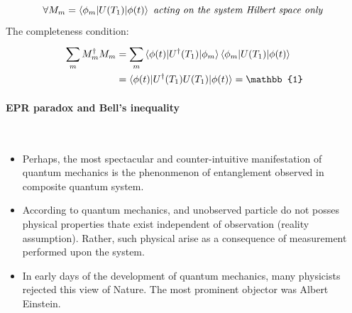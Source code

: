 \documentclass[]{article}
\theoremstyle{nonumberplain}
\begin{document}
\[
	 \forall M_{m}=\braket{\phi_{m}|U(T_{1})|\phi(t)}\ \textit{acting on the system Hilbert space only }
\] 
The completeness condition:
\begin{equation*}
\begin{aligned}
	\sum^{}_{m} M_{m}^{\dagger}M_{m} &= \sum^{}_{m} \braket{\phi(t)|U^{\dagger}(T_{1})|\phi_{m}}\braket{\phi_{m}|U(T_{1})|\phi(t)}\\
												&=\braket{\phi(t)|U^{\dagger}(T_{1})U(T_{1})|\phi(t)} = \mathbb{1}
\end{aligned}
\end{equation*}
\paragraph{EPR paradox and Bell's inequality}%
\label{par:epr_paradox_and_bell_s_inequality} \ \\ 
\begin{itemize}
	\item Perhaps, the most spectacular and counter-intuitive manifestation of quantum mechanics is the phenonmenon of entanglement observed in composite quantum system. 
	\item According to quantum mechanics, and unobserved particle do not posses physical properties thate exist independent of observation (reality assumption). Rather, such physical arise as a consequence of measurement performed upon the system.
	\item In early days of the development of quantum mechanics, many physicists rejected this view of Nature. The most prominent objector was Albert Einstein.
\end{itemize}
\end{document}

